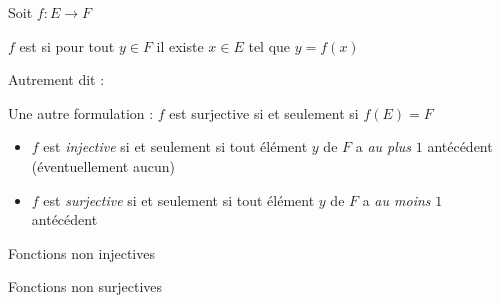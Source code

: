 \begin{frame}
Soit $f : E \to F$ 
\begin{mydefinition}
$f$ est  si pour tout $y \in F$ il existe $x \in E$ tel que $y=f(x)$
\end{mydefinition}

\medskip
\pause

Autrement dit :

\medskip
\pause

 Une autre formulation : $f$ est surjective si et seulement si $f(E)=F$

\pause

\end{frame}


\begin{frame}

\begin{remarque}


\begin{itemize}



\pause

  \item $f$ est \emph{injective} si et seulement si tout élément $y$ de $F$ a \emph{au plus} $1$ antécédent (éventuellement aucun)

\pause

  \item $f$ est \emph{surjective} si et seulement si tout élément $y$ de $F$ a \emph{au moins} $1$ antécédent
\end{itemize}
\end{remarque}
\end{frame}

\begin{frame}


\centerline{Fonctions non injectives}

\end{frame} 


\begin{frame}

\centerline{Fonctions non surjectives}
\end{frame}

